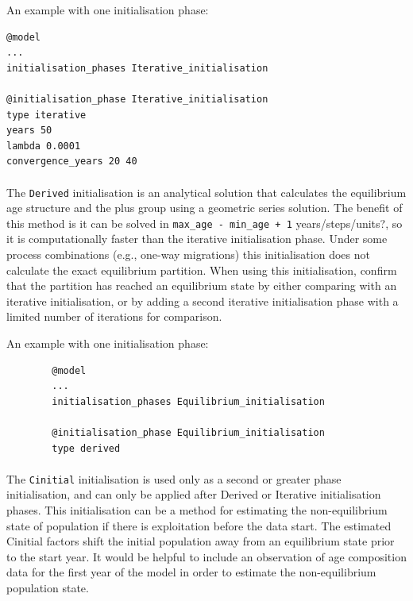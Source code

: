 An example with one initialisation phase:

{\small{\begin{verbatim}
@model
...
initialisation_phases Iterative_initialisation

@initialisation_phase Iterative_initialisation
type iterative
years 50
lambda 0.0001
convergence_years 20 40
\end{verbatim}}}

\paragraph{}

The \texttt{Derived} initialisation is an analytical solution that calculates the equilibrium age structure and the plus group using a geometric series solution. The benefit of this method is it can be solved in \texttt{max\_age - min\_age + 1} years/steps/units?, so it is computationally faster than the iterative initialisation phase. Under some process combinations (e.g., one-way migrations) this initialisation does not calculate the exact equilibrium partition. When using this initialisation, confirm that the partition has reached an equilibrium state by either comparing with an iterative initialisation, or by adding a second iterative initialisation phase with a limited number of iterations for comparison.

An example with one initialisation phase:

{\small{\begin{verbatim}
		@model
		...
		initialisation_phases Equilibrium_initialisation

		@initialisation_phase Equilibrium_initialisation
		type derived
		\end{verbatim}}}

\paragraph{}

The \texttt{Cinitial} initialisation is used only as a second or greater phase initialisation, and can only be applied after Derived or Iterative initialisation phases. This initialisation can be a method for estimating the non-equilibrium state of population if there is exploitation before the data start. The estimated Cinitial factors shift the initial population away from an equilibrium state prior to the start year. It would be helpful to include an observation of age composition data for the first year of the model in order to estimate the non-equilibrium population state.

